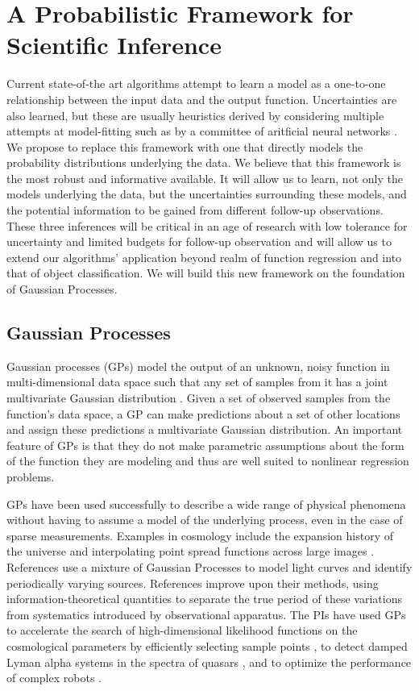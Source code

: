 \documentclass[prd,nofootbib,floatfix,11pt,tightenlines,nofootinbib]{revtex4}
\begin{document}
\section{A Probabilistic Framework for Scientific Inference}

Current state-of-the art algorithms attempt to learn a 
model as a one-to-one
relationship between the input data and the output function. Uncertainties are
also learned, but these are usually heuristics derived by considering multiple
attempts at model-fitting such as by a committee of aritficial neural networks
\cite{annz}.  We propose to replace this framework with one that directly models
the probability distributions underlying the data.
We believe that this framework
is the most robust and informative available.  It will allow us
to learn, not only
the models underlying the data, but the uncertainties surrounding these models,
and the potential information to be gained from different follow-up
observations.  These three inferences will be critical in an age of
research with low tolerance for uncertainty and limited budgets for
follow-up observation and will allow us to extend our algorithms' application
beyond realm of function regression and into that of object classification.
We will build this new framework on the foundation of Gaussian Processes.  

\subsection{Gaussian Processes}
\label{sec:gp}


Gaussian processes (GPs) model the output of an unknown, noisy function
in multi-dimensional data space
such that any set of samples from it has a joint multivariate Gaussian
distribution \cite{gp}.  Given a set of observed samples from the function's
data space, a GP
can make predictions about a set of other locations and assign these
predictions a multivariate Gaussian distribution.  An important
feature of GPs is that they do not make parametric assumptions about the
form of the function they are modeling and thus are well suited to
nonlinear regression problems.

GPs have been used successfully to describe a wide range of physical
phenomena without having to assume a model of the underlying process, even
in the case of sparse measurements.  Examples in cosmology include the
expansion history of the universe \cite{ericgp} and interpolating point
spread functions across large images \cite{psf}.  References 
\cite{mahabal2008b,wang2011,wang2012} 
use a mixture of Gaussian Processes to model light curves and
identify periodically varying sources.  References \cite{huijse2011,huijse2012}
improve upon their methods, using information-theoretical quantities to
separate the true period of these variations from systematics introduced by
observational apparatus.  The PIs have used GPs to accelerate the search of
high-dimensional likelihood functions on the cosmological parameters by
efficiently selecting sample points \cite{daniel2012}, to detect damped Lyman
alpha systems in the spectra of quasars \cite{Garnett12a}, and to optimize the
performance of complex robots \cite{Tesch13,Tesch11a,Tesch11b}.
\end{document}
